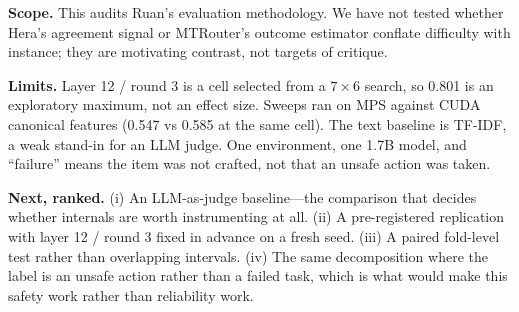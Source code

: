 \documentclass[10pt]{article}
\begin{document}
\textbf{Scope.} This audits Ruan's evaluation methodology. We have not tested whether
Hera's agreement signal or MTRouter's outcome estimator conflate difficulty with
instance; they are motivating contrast, not targets of critique.

\textbf{Limits.} Layer 12 / round 3 is a cell selected from a $7\times6$ search, so
0.801 is an exploratory maximum, not an effect size. Sweeps ran on MPS against CUDA
canonical features (0.547 vs 0.585 at the same cell). The text baseline is TF-IDF, a
weak stand-in for an LLM judge. One environment, one 1.7B model, and ``failure''
means the item was not crafted, not that an unsafe action was taken.

\textbf{Next, ranked.} (i) An LLM-as-judge baseline---the comparison that decides
whether internals are worth instrumenting at all. (ii) A pre-registered replication
with layer 12 / round 3 fixed in advance on a fresh seed. (iii) A paired fold-level
test rather than overlapping intervals. (iv) The same decomposition where the label
is an unsafe action rather than a failed task, which is what would make this safety
work rather than reliability work.
\end{document}
